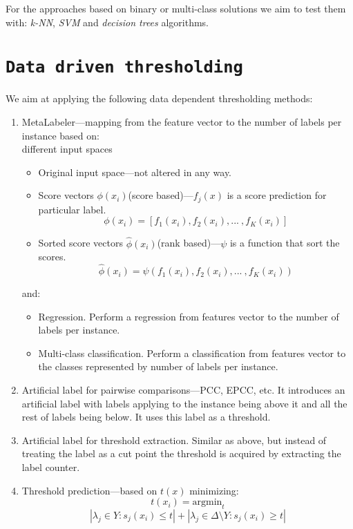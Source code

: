 \documentclass[12pt,a4paper,twocolumn]{article}
\newcommand{\ts}{\textsuperscript}
\begin{document}
For the approaches based on binary or multi-class solutions we aim to test them with: \emph{k-NN}, \emph{SVM} and \emph{decision trees} algorithms.

\section*{\texttt{Data driven thresholding}}
We aim at applying the following data dependent thresholding methods:


\begin{enumerate}
\item MetaLabeler---mapping from the feature vector to the number of labels per instance based on:\\

	different input spaces
	\begin{itemize} %
	\item Original input space---not altered in any way.
	\item Score vectors $\phi(x_i)$(score based)---$f_j(x)$ is a score prediction for particular label.
	$$
	\phi(x_i) = [ f_1(x_i), f_2(x_i), ...\ , f_K(x_i) ]
	$$
	\item Sorted score vectors $\hat{\phi}(x_i)$(rank based)---$\psi$ is a function that sort the scores.
	$$
	\hat{\phi}(x_i) = \psi ( f_1(x_i), f_2(x_i), ...\ , f_K(x_i) )
	$$
	\end{itemize}

	and:
	\begin{itemize} %
	\item Regression. Perform a regression from features vector to the number of labels per instance.
	\item Multi-class classification. Perform a classification from features vector to the classes represented by number of labels per instance.
	\end{itemize}

\item Artificial label for pairwise comparisons---PCC, EPCC, etc. It introduces an artificial label with labels applying to the instance being above it and all the rest of labels being below. It uses this label as a threshold.
\item Artificial label for threshold extraction. Similar as above, but instead of treating the label as a cut point the threshold is acquired by extracting the label counter.%
\item Threshold prediction---based on $t(x)$ minimizing:
	$$
	t(x_i) = \text{argmin}_t $$ $$ | \lambda_j \in Y : s_j(x_i) \leq t | + | \lambda_j \in \Delta \text{\textbackslash{}} Y : s_j(x_i) \geq t |
	$$
\end{enumerate}
\end{document}
